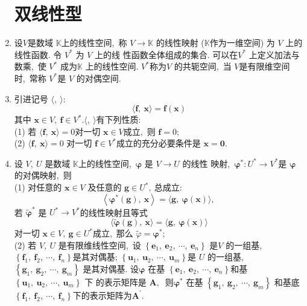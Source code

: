 \begin{enumerate}
		\section{双线性型}
		\item 设$  V  $是数域  $\mathbb{K}  $上的线性空间,\  称  $V \rightarrow \mathbb{K}$  的线性映射  ($\mathbb{K}  $作为一维空间) 为 $ V $ 上的线性函数. 令  $V^{*} $ 为 $ V$  上的线 性函数全体组成的集合. 可以在$  V^{*} $ 上定义加法与数乘,\  使  $V^{*} $ 成为$  \mathbb{K} $ 上的线性空间. $ V^{*} $称为$  V$  的共轭空间,\  当 $ V  $是有限维空间时,\  常称  $V^{*}  $是  $V $ 的对偶空间.
		\item 引进记号 $ \langle ,\  \rangle : $
		$$\langle\boldsymbol{f},\  \boldsymbol{x}\rangle=\boldsymbol{f}(\boldsymbol{x})$$
		其中 $ \boldsymbol{x} \in V,\  \boldsymbol{f} \in V^{*} .\langle ,\  \rangle $有下列性质:\\
		(1) 若  $\langle\boldsymbol{f},\  \boldsymbol{x}\rangle=0  $对一切  $\boldsymbol{x} \in V  $成立,\  则 $ \boldsymbol{f}=0 ;$\\
		(2)  $\langle\boldsymbol{f},\  \boldsymbol{x}\rangle=0 $ 对一切  $\boldsymbol{f} \in V^{*}  $成立的充分必要条件是  $\boldsymbol{x}=\mathbf{0} .$
		\item 设  $V,\  U $ 是数域 $ \mathbb{K}  $上的线性空间,\ $\boldsymbol{\varphi}$ 是 $ V \rightarrow U $ 的线性 映射,\ $  \boldsymbol{\varphi}^{*}: U^{*} \rightarrow V^{*}  $是  $\boldsymbol{\varphi}$的对偶映射,\  则\\
		(1) 对任意的 $ \boldsymbol{x}\in V$  及任意的 $ \boldsymbol{g} \in U^{*} ,\  $总成立:
		$$\left\langle\boldsymbol{\varphi}^{*}(\boldsymbol{g}),\  \boldsymbol{x}\right\rangle=\langle\boldsymbol{g},\  \boldsymbol{\varphi}(\boldsymbol{x})\rangle,\ $$
		若  $\tilde{\boldsymbol{\varphi}}^*$  是 $ U^{*} \rightarrow V^{*}  $的线性映射且等式
		$$\langle\tilde{\boldsymbol{\varphi}}(\boldsymbol{g}),\  \boldsymbol{x}\rangle=\langle\boldsymbol{g},\  \boldsymbol{\varphi}(\boldsymbol{x})\rangle$$
		对一切  $\boldsymbol{x} \in V,\  \boldsymbol{g} \in U^{*}  $成立,\  那么  $\tilde{\varphi}=\boldsymbol{\varphi}^{*} ;$\\
		(2) 若 $ V,\  U$  是有限维线性空间,\  设 $ \left\{\boldsymbol{e}_{1},\  \boldsymbol{e}_{2},\  \cdots,\  \boldsymbol{e}_{n}\right\} $ 是$  V$  的一组基,\  $ \left\{\boldsymbol{f}_{1},\  \boldsymbol{f}_{2},\  \cdots,\  \boldsymbol{f}_{n}\right\}  $是其对偶基;  $\left\{\boldsymbol{u}_{1},\  \boldsymbol{u}_{2},\  \cdots\right. ,\   \left.\boldsymbol{u}_{m}\right\}  $是  $U $ 的一组基,\   $\left\{\boldsymbol{g}_{1},\  \boldsymbol{g}_{2},\  \cdots,\  \boldsymbol{g}_{m}\right\} $ 是其对偶基. 设$  \boldsymbol{\varphi} $ 在基  $\left\{\boldsymbol{e}_{1},\  \boldsymbol{e}_{2},\  \cdots,\  \boldsymbol{e}_{n}\right\}  $和基 $ \left\{\boldsymbol{u}_{1},\  \boldsymbol{u}_{2},\  \cdots,\  \boldsymbol{u}_{m}\right\} $ 下 的表示矩阵是 $ \boldsymbol{A} ,\ $ 则$  \boldsymbol{\varphi}^{*} $ 在基  $\left\{\boldsymbol{g}_{1},\  \boldsymbol{g}_{2},\  \cdots,\  \boldsymbol{g}_{m}\right\} $ 和基底$  \left\{\boldsymbol{f}_{1},\  \boldsymbol{f}_{2},\  \cdots,\  \boldsymbol{f}_{n}\right\}  $下的表示矩阵为$  \boldsymbol{A}^{\prime} .$

\end{enumerate}
